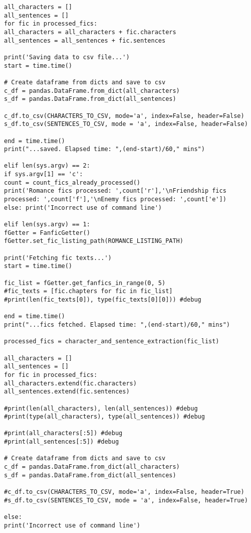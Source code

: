\documentclass{pre-tfg}
\begin{document}
\begin{lstlisting}[style=consola]
all_characters = []
all_sentences = []
for fic in processed_fics: 
all_characters = all_characters + fic.characters
all_sentences = all_sentences + fic.sentences

print('Saving data to csv file...')
start = time.time()

# Create dataframe from dicts and save to csv
c_df = pandas.DataFrame.from_dict(all_characters)
s_df = pandas.DataFrame.from_dict(all_sentences)

c_df.to_csv(CHARACTERS_TO_CSV, mode='a', index=False, header=False)
s_df.to_csv(SENTENCES_TO_CSV, mode = 'a', index=False, header=False)

end = time.time()
print("...saved. Elapsed time: ",(end-start)/60," mins")

elif len(sys.argv) == 2:
if sys.argv[1] == 'c': 
count = count_fics_already_processed()
print('Romance fics processed: ',count['r'],'\nFriendship fics processed: ',count['f'],'\nEnemy fics processed: ',count['e'])
else: print('Incorrect use of command line')

elif len(sys.argv) == 1:
fGetter = FanficGetter()
fGetter.set_fic_listing_path(ROMANCE_LISTING_PATH)

print('Fetching fic texts...')
start = time.time()

fic_list = fGetter.get_fanfics_in_range(0, 5)
#fic_texts = [fic.chapters for fic in fic_list]
#print(len(fic_texts[0]), type(fic_texts[0][0])) #debug

end = time.time()
print("...fics fetched. Elapsed time: ",(end-start)/60," mins")

processed_fics = character_and_sentence_extraction(fic_list)

all_characters = []
all_sentences = []
for fic in processed_fics: 
all_characters.extend(fic.characters)
all_sentences.extend(fic.sentences)

#print(len(all_characters), len(all_sentences)) #debug
#print(type(all_characters), type(all_sentences)) #debug

#print(all_characters[:5]) #debug
#print(all_sentences[:5]) #debug

# Create dataframe from dicts and save to csv
c_df = pandas.DataFrame.from_dict(all_characters)
s_df = pandas.DataFrame.from_dict(all_sentences)

#c_df.to_csv(CHARACTERS_TO_CSV, mode='a', index=False, header=True)
#s_df.to_csv(SENTENCES_TO_CSV, mode = 'a', index=False, header=True)

else:
print('Incorrect use of command line')


\end{lstlisting}
\end{document}
